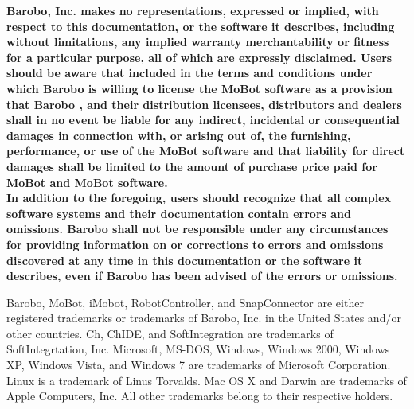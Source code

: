 \noindent
{\bf 
Barobo, Inc.
makes no representations, expressed or implied, with respect
to this documentation, or the software
it describes, including without limitations, any implied
warranty merchantability or fitness for a particular
purpose, all of which are expressly disclaimed.
Users should be aware that included in the terms and conditions
under which  Barobo is willing to license the MoBot software
as a provision that
Barobo , and their distribution
licensees, distributors and dealers shall in no event
be liable for any indirect, incidental or consequential
damages in connection with, 
or arising out of, the furnishing, performance,
or use of the MoBot software
and that liability for direct damages shall be limited
to the amount of purchase price paid for MoBot and MoBot software.\\

\noindent
In addition to the foregoing, users should recognize
that all complex software systems and their documentation
contain errors and omissions. Barobo
shall not be responsible under any circumstances
for providing information on or corrections to errors
and omissions discovered at any time in this documentation
or the software it describes,
even if Barobo has
been advised of the errors or omissions.\\
}


\noindent
Barobo, MoBot, iMobot, RobotController, and SnapConnector
are either
registered trademarks or trademarks of Barobo, Inc.
in the United States and/or other countries.
Ch, ChIDE, and  SoftIntegration 
are trademarks of SoftIntegrtation, Inc.
Microsoft, MS-DOS, Windows, Windows 2000, Windows XP, 
Windows Vista, and Windows 7
are trademarks of Microsoft Corporation.
Linux is a trademark of Linus Torvalds.
Mac OS X and Darwin are trademarks of Apple Computers, Inc.
All other trademarks belong to their respective holders.
